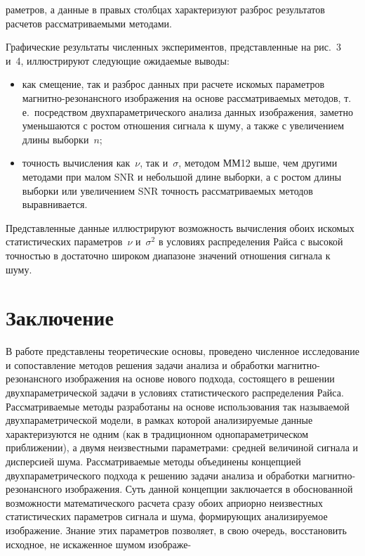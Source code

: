 \begin{multicols}{2}

\noindent
раметров, а данные в правых столбцах характеризуют разброс
результатов расчетов рассматриваемыми методами.


     Графические результаты численных экспериментов, представленные на рис.~3 и~4,
иллюстрируют следующие ожидаемые выводы:
     \begin{itemize} %
\item как смещение, так и разброс данных при расчете искомых параметров
маг\-нит\-но-ре\-зо\-нансно\-го изображения на основе рассматриваемых методов, т.\,е.\
посредством двухпараметрического анализа данных изображения, заметно уменьшаются с
ростом отношения сигнала к шуму, а также с увеличением длины выборки~$n$;
\item точность вычисления как~$\nu$, так и~$\sigma$, методом ММ12 выше, чем другими
методами при малом SNR и небольшой длине выборки, а с ростом длины выборки или
увеличением SNR точность рассматриваемых методов выравнивается.
     \end{itemize}

     Представленные данные иллюстрируют возможность вычисления обоих искомых
статистических параметров~$\nu$ и~$\sigma^2$ в условиях распределения Райса с
высокой точностью в достаточно широком диапазоне значений отношения сигнала к
шуму.




\section{Заключение}

    В работе представлены теоретические основы, проведено численное исследование и
со\-по\-став\-ление методов решения задачи анализа и обработки маг\-нит\-но-резонансного
изображения на \mbox{основе} нового подхода, состоящего в решении двух\-па\-ра\-мет\-ри\-че\-ской
задачи в условиях статистического распределения Райса. Рассматриваемые методы
разработаны на основе использования так называемой двух\-па\-ра\-мет\-ри\-че\-ской модели, в
рамках которой анализируемые данные характеризуются не одним (как в традиционном
однопараметрическом приближении), а двумя неизвестными параметрами: средней
величиной сигнала и дисперсией шума. Рассматриваемые методы объединены концепцией
двухпараметрического подхода к решению задачи анализа и обработки
магнитно-резонансного изоб\-ра\-же\-ния. Суть данной концепции заключается в обоснованной
возможности математического расчета сразу обоих априорно неизвестных статистических
параметров сигнала и шума, формирующих анализируемое изображение. Знание этих
параметров позволяет, в свою очередь, восстановить исходное, не искаженное шумом
изображе-\linebreak\vspace*{-12pt}

\pagebreak

\end{multicols}

